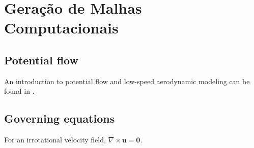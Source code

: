 \chapter{Geração de Malhas Computacionais}
\ChapterTOC

\section{Potential flow}
An introduction to potential flow and low-speed aerodynamic modeling can be found in \cite{katz2001}.

\section{Governing equations}
For an irrotational velocity field, $\nabla\times\mathbf{u}=\mathbf{0}$.

\ChapterReferences
